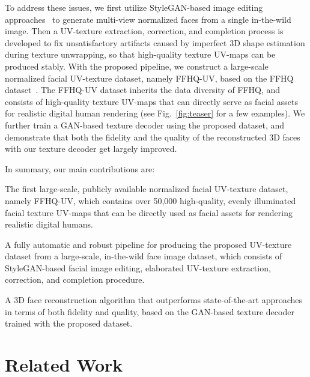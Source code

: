 \documentclass[10pt,twocolumn,letterpaper]{article}
\begin{document}
To address these issues, we first utilize StyleGAN-based image editing approaches~\cite{karras2020analyzing,abdal2021styleflow,shen2020interpreting} to generate multi-view normalized faces from a single in-the-wild image.
Then a UV-texture extraction, correction, and completion process is developed to fix unsatisfactory artifacts caused by imperfect 3D shape estimation during texture unwrapping, so that high-quality texture UV-maps can be produced stably.
With the proposed pipeline, we construct a large-scale normalized facial UV-texture dataset, namely FFHQ-UV, based on the FFHQ dataset~\cite{karras2019style}.
The FFHQ-UV dataset inherits the data diversity of FFHQ, and consists of high-quality texture UV-maps that can directly serve as facial assets for realistic digital human rendering (see Fig.~\ref{fig:teaser} for a few examples). 
We further train a GAN-based texture decoder using the proposed dataset, and demonstrate that both the fidelity and the quality of the reconstructed 3D faces with our texture decoder get largely improved. 


In summary, our main contributions are:
\begin{compactitem}
    \item The first large-scale, publicly available normalized facial UV-texture dataset, namely FFHQ-UV, which contains over 50,000 high-quality, evenly illuminated facial texture UV-maps that can be directly used as facial assets for rendering realistic digital humans. 
\item A fully automatic and robust pipeline for producing the proposed UV-texture dataset from a large-scale, in-the-wild face image dataset, which consists of StyleGAN-based facial image editing, elaborated UV-texture extraction, correction, and completion procedure.
\item A 3D face reconstruction algorithm that outperforms state-of-the-art approaches in terms of both fidelity and quality, based on the GAN-based texture decoder trained with the proposed dataset.
\end{compactitem}


\section{Related Work}
\vspace{-1mm}
\end{document}
